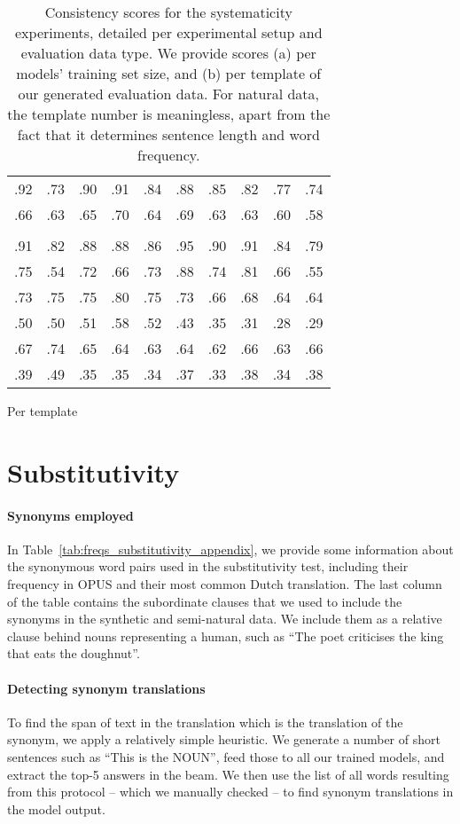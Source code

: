 \begin{table*}[!h]
\begin{subtable}[b]{0.49\textwidth}
\begin{tabular}{cccccccccc}
    .92 & .73 & .90 & .91 & .84 & .88 & .85 & .82 & .77 & .74 \\
    .66 & .63 & .65 & .70 & .64 & .69 & .63 & .63 & .60 & .58 \\ \midrule \\
    .91 & .82 & .88 & .88 & .86 & .95 & .90 & .91 & .84 & .79 \\
    .75 & .54 & .72 & .66 & .73 & .88 & .74 & .81 & .66 & .55 \\
    .73 & .75 & .75 & .80 & .75 & .73 & .66 & .68 & .64 & .64 \\
    .50 & .50 & .51 & .58 & .52 & .43 & .35 & .31 & .28 & .29 \\
    .67 & .74 & .65 & .64 & .63 & .64 & .62 & .66 & .63 & .66 \\
    .39 & .49 & .35 & .35 & .34 & .37 & .33 & .38 & .34 & .38 \\
    \bottomrule
    \end{tabular}
    \caption{Per template}
    \end{subtable}
    \caption{Consistency scores for the systematicity experiments, detailed per experimental setup and evaluation data type. We provide scores (a) per models' training set size, and (b) per template of our generated evaluation data. For natural data, the template number is meaningless, apart from the fact that it determines sentence length and word frequency.}
    \label{tab:systematicity_appendix}
\end{table*}


\section{Substitutivity}
\label{ap:substitutivity}

\paragraph{Synonyms employed} In Table~\ref{tab:freqs_substitutivity_appendix}, we provide some information about the synonymous word pairs used in the substitutivity test, including their frequency in OPUS and their most common Dutch translation. 
The last column of the table contains the subordinate clauses that we used to include the synonyms in the synthetic and semi-natural data. 
We include them as a relative clause behind nouns representing a human, such as ``The poet criticises the king that eats the doughnut''.

\paragraph{Detecting synonym translations}
To find the span of text in the translation which is the translation of the synonym, we apply a relatively simple heuristic.
We generate a number of short sentences such as ``This is the NOUN'', feed those to all our trained models, and extract the top-5 answers in the beam.
We then use the list of all words resulting from this protocol -- which we manually checked -- to find synonym translations in the model output.

